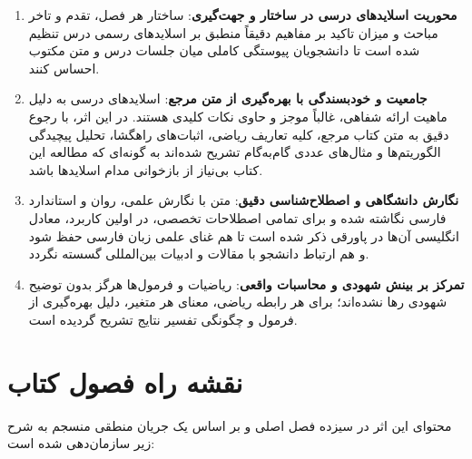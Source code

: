 \begin{enumerate}
    \item \textbf{محوریت اسلایدهای درسی در ساختار و جهت‌گیری}: ساختار هر فصل، تقدم و تاخر مباحث و میزان تاکید بر مفاهیم دقیقاً منطبق بر اسلایدهای رسمی درس تنظیم شده است تا دانشجویان پیوستگی کاملی میان جلسات درس و متن مکتوب احساس کنند.
    \item \textbf{جامعیت و خودبسندگی با بهره‌گیری از متن مرجع}: اسلایدهای درسی به دلیل ماهیت ارائه شفاهی، غالباً موجز و حاوی نکات کلیدی هستند. در این اثر، با رجوع دقیق به متن کتاب مرجع، کلیه تعاریف ریاضی، اثبات‌های راهگشا، تحلیل پیچیدگی الگوریتم‌ها و مثال‌های عددی گام‌به‌گام تشریح شده‌اند به گونه‌ای که مطالعه این کتاب بی‌نیاز از بازخوانی مدام اسلایدها باشد.
    \item \textbf{نگارش دانشگاهی و اصطلاح‌شناسی دقیق}: متن با نگارش علمی، روان و استاندارد فارسی نگاشته شده و برای تمامی اصطلاحات تخصصی، در اولین کاربرد، معادل انگلیسی آن‌ها در پاورقی ذکر شده است تا هم غنای علمی زبان فارسی حفظ شود و هم ارتباط دانشجو با مقالات و ادبیات بین‌المللی گسسته نگردد.
    \item \textbf{تمرکز بر بینش شهودی و محاسبات واقعی}: ریاضیات و فرمول‌ها هرگز بدون توضیح شهودی رها نشده‌اند؛ برای هر رابطه ریاضی، معنای هر متغیر، دلیل بهره‌گیری از فرمول و چگونگی تفسیر نتایج تشریح گردیده است.
\end{enumerate}

\section*{نقشه راه فصول کتاب}
محتوای این اثر در سیزده فصل اصلی و بر اساس یک جریان منطقی منسجم به شرح زیر سازمان‌دهی شده است:

